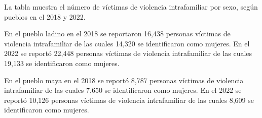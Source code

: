 La tabla muestra el número de víctimas de violencia intrafamiliar por sexo, según pueblos en el 2018 y 2022. 

En el pueblo ladino en el 2018 se reportaron 16,438 personas víctimas de violencia intrafamiliar de las cuales 14,320 se identificaron como mujeres. En el 2022 se reportó 22,448 personas víctimas de violencia intrafamiliar de las cuales 19,133 se identificaron como mujeres.

En el pueblo maya en el 2018 se reportó 8,787 personas víctimas de violencia intrafamiliar de las cuales 7,650 se identificaron como mujeres. En el 2022 se reportó 10,126 personas víctimas de violencia intrafamiliar de las cuales 8,609 se identificaron como mujeres.
